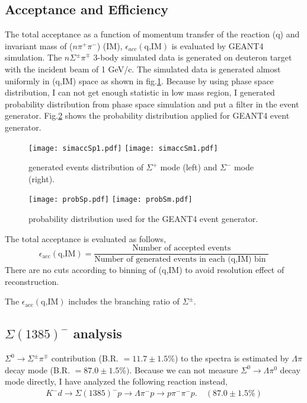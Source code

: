 \subsection{Acceptance and Efficiency}
The total acceptance as a function of momentum transfer of the reaction (q) and invariant mass of ($n\pi^+\pi^-$) (IM), $\epsilon_{acc}(\mbox{q,IM})$ is evaluated by GEANT4 simulation.
The $n\Sigma^{\pm}\pi^{\mp}$ 3-body simulated data is generated on deuteron target with the incident beam of 1 GeV/c.
The simulated data is generated almost uniformly in (q,IM) space as shown in fig.\ref{fig:genSpSm}. 
Because by using phase space distribution, I can not get enough statistic in low mass region, I generated probability distribution from phase space simulation and put a filter in the event generator. 
Fig.\ref{fig:probSpSm} shows the probability distribution applied for GEANT4 event generator.

\begin{figure}
\texttt{[image: simaccSp1.pdf]}
\texttt{[image: simaccSm1.pdf]}\label{fig:genSpSm}
\caption{generated events distribution of $\Sigma^+$ mode (left) and $\Sigma^-$ mode (right).}
\end{figure}

\begin{figure}
\texttt{[image: probSp.pdf]}
\texttt{[image: probSm.pdf]}\label{fig:probSpSm}
\caption{probability distribution used for the GEANT4 event generator.}
\end{figure}



The total acceptance is evaluated as follows,
\[
\epsilon_{\mbox{acc}}(\mbox{q,IM}) = \frac{\mbox{Number of accepted events}}{\mbox{Number of generated events in each (q,IM) bin }}
\]
There are no cuts according to binning of (q,IM) to avoid resolution effect of reconstruction.

The $\epsilon_{\mbox{acc}}(\mbox{q,IM})$ includes the branching ratio of $\Sigma^{\pm}$. 



\subsection{$\Sigma(1385)^{-}$ analysis}
$\Sigma^0 \rightarrow \Sigma^\pm\pi^\mp$ contribution (B.R. $=11.7 \pm 1.5 \%$) to the spectra is estimated by $\Lambda \pi$ decay mode (B.R. $=87.0 \pm 1.5 \%)$.
Because we can not measure $\Sigma^0 \rightarrow \Lambda \pi^0$ decay mode directly, I have analyzed the following reaction instead,
\begin{eqnarray}
 K^-d \rightarrow \Sigma(1385)^-p \rightarrow \Lambda \pi^- p \rightarrow p\pi^-\pi^-p. \quad (87.0 \pm 1.5 \%) 
\end{eqnarray}
